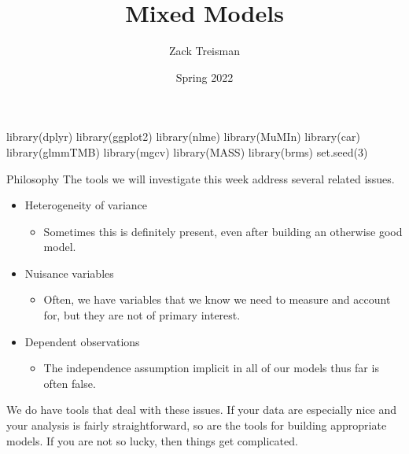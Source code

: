 \documentclass[
  ignorenonframetext,
]{beamer}
\title{Mixed Models}
\author{Zack Treisman}
\date{Spring 2022}
\newenvironment{Shaded}{\begin{snugshade}}{\end{snugshade}}
\newcommand{\DecValTok}[1]{\textcolor[rgb]{0.00,0.00,0.81}{#1}}
\newcommand{\FunctionTok}[1]{\textcolor[rgb]{0.00,0.00,0.00}{#1}}
\newcommand{\NormalTok}[1]{#1}
\providecommand{\tightlist}{%
  \setlength{\itemsep}{0pt}\setlength{\parskip}{0pt}}
\begin{document}
\frame{\titlepage}

\begin{frame}[fragile]
\begin{Shaded}
\begin{Highlighting}[]
\FunctionTok{library}\NormalTok{(dplyr)}
\FunctionTok{library}\NormalTok{(ggplot2)}
\FunctionTok{library}\NormalTok{(nlme)}
\FunctionTok{library}\NormalTok{(MuMIn)}
\FunctionTok{library}\NormalTok{(car)}
\FunctionTok{library}\NormalTok{(glmmTMB)}
\FunctionTok{library}\NormalTok{(mgcv)}
\FunctionTok{library}\NormalTok{(MASS)}
\FunctionTok{library}\NormalTok{(brms)}
\FunctionTok{set.seed}\NormalTok{(}\DecValTok{3}\NormalTok{)}
\end{Highlighting}
\end{Shaded}
\end{frame}

\begin{frame}{Philosophy}
\protect\hypertarget{philosophy}{}
The tools we will investigate this week address several related issues.

\begin{itemize}
\tightlist
\item
  Heterogeneity of variance

  \begin{itemize}
  \tightlist
  \item
    Sometimes this is definitely present, even after building an
    otherwise good model.
  \end{itemize}
\item
  Nuisance variables

  \begin{itemize}
  \tightlist
  \item
    Often, we have variables that we know we need to measure and account
    for, but they are not of primary interest.
  \end{itemize}
\item
  Dependent observations

  \begin{itemize}
  \tightlist
  \item
    The independence assumption implicit in all of our models thus far
    is often false.
  \end{itemize}
\end{itemize}

We do have tools that deal with these issues. If your data are
especially nice and your analysis is fairly straightforward, so are the
tools for building appropriate models. If you are not so lucky, then
things get complicated.
\end{frame}
\end{document}
